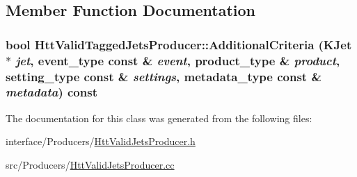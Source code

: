 \subsection{Member Function Documentation}
\hypertarget{classHttValidTaggedJetsProducer_a73f48f12711a153748ecd9f5da611fb6}{
\subsubsection[{AdditionalCriteria}]{\setlength{\rightskip}{0pt plus 5cm}bool HttValidTaggedJetsProducer::AdditionalCriteria (KJet $\ast$ {\em jet}, \/  {\bf event\_\-type} const \& {\em event}, \/  {\bf product\_\-type} \& {\em product}, \/  {\bf setting\_\-type} const \& {\em settings}, \/  {\bf metadata\_\-type} const \& {\em metadata}) const}}
\label{classHttValidTaggedJetsProducer_a73f48f12711a153748ecd9f5da611fb6}


The documentation for this class was generated from the following files:\begin{DoxyCompactItemize}
\item 
interface/Producers/\hyperlink{HttValidJetsProducer_8h}{HttValidJetsProducer.h}\item 
src/Producers/\hyperlink{HttValidJetsProducer_8cc}{HttValidJetsProducer.cc}\end{DoxyCompactItemize}
